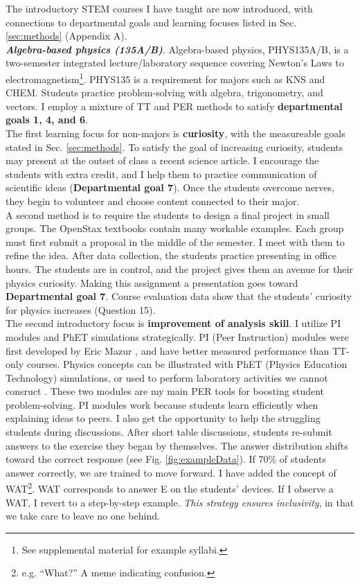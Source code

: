 \documentclass[../../../main.tex]{subfiles}
\begin{document}
The introductory STEM courses I have taught are now introduced, with connections to departmental goals and learning focuses listed in Sec. \ref{sec:methods} (Appendix A).
\\
\vspace{0.15cm}
\textbf{\textit{Algebra-based physics (135A/B)}}. Algebra-based physics, PHYS135A/B, is a two-semester integrated lecture/laboratory sequence covering Newton's Laws to electromagnetism\footnote{See supplemental material for example syllabi.}.  PHYS135 is a requirement for majors such as KNS and CHEM.  Students practice problem-solving with algebra, trigonometry, and vectors.  I employ a mixture of TT and PER methods to satisfy \textbf{departmental goals 1, 4, and 6}.
\\
\vspace{0.15cm}
The first learning focus for non-majors is \textbf{curiosity}, with the measureable goals stated in Sec. \ref{sec:methods}.  To satisfy the goal of increasing curiosity, students may present at the outset of class a recent science article.  I encourage the students with extra credit, and I help them to practice communication of scientific ideas (\textbf{Departmental goal 7}).  Once the students overcome nerves, they begin to volunteer and choose content connected to their major.
\\
\vspace{0.15cm}
A second method is to require the students to design a final project in small groups.  The OpenStax textbooks contain many workable examples.  Each group must first submit a proposal in the middle of the semester.  I meet with them to refine the idea.  After data collection, the students practice presenting in office hours.  The students are in control, and the project gives them an avenue for their physics curiosity.  Making this assignment a presentation goes toward \textbf{Departmental goal 7}.  Course evaluation data show that the students' curiosity for physics increases (Question 15).
\\
\vspace{0.15cm}
The second introductory focus is \textbf{improvement of analysis skill}.  I utilize PI modules and PhET simulations strategically.  PI (Peer Instruction) modules were first developed by Eric Mazur \cite{mazur2013peer}, and have better measured performance than TT-only courses.  Physics concepts can be illustrated with PhET (Physics Education Technology) simulations, or used to perform laboratory activities we cannot consruct \cite{phet}.  These two modules are my main PER tools for boosting student problem-solving.  PI modules work because students learn efficiently when explaining ideas to peers.  I also get the opportunity to help the struggling students during discussions.  After short table discussions, students re-submit answers to the exercise they began by themselves.  The answer distribution shifts toward the correct response (see Fig. \ref{fig:exampleData}).  If 70\% of students answer correctly, we are trained to move forward.  I have added the concept of WAT\footnote{e.g. ``What?'' A meme indicating confusion.}.  WAT corresponds to answer E on the students' devices.  If I observe a WAT, I revert to a step-by-step example.  \textit{This strategy ensures inclusivity}, in that we take care to leave no one behind.
\end{document}
